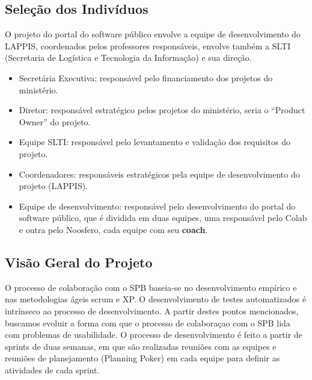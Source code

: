 
\subsection{Seleção dos Indivíduos}

O projeto do portal do software público envolve a equipe de desenvolvimento do LAPPIS, coordenados pelos professores responsáveis, envolve também a SLTI (Secretaria de Logística e Tecnologia da Informação) e sua direção.

\begin{itemize}

\item Secretária Executiva: responsável pelo financiamento dos projetos do ministério.

\item Diretor: responsável estratégico pelos projetos do ministério, seria o ``Product Owner'' do projeto.

\item Equipe SLTI: responsável pelo levantamento e validação dos requisitos do projeto.

\item Coordenadores: responsáveis estratégicos pela equipe de desenvolvimento do projeto (LAPPIS).

\item Equipe de desenvolvimento: responsável pelo desenvolvimento do portal do software público, que é dividida em duas equipes, uma responsável pelo Colab e outra pelo Noosfero, cada equipe com seu \textbf{coach}.

\end{itemize}

\subsection{Visão Geral do Projeto}

O processo de colaboração com o SPB baseia-se no desenvolvimento empírico e nas metodologias ágeis scrum e XP. O desenvolvimento de testes automatizados é intrínseco ao processo de desenvolvimento. A partir destes pontos mencionados, buscamos evoluir a forma com que o processo de colaboraçao com o SPB lida com problemas de usabilidade.
O processo de desenvolvimento é feito a partir de sprints de duas semanas, em que são realizadas reuniões com as equipes e reuniões de planejamento (Planning Poker) em cada equipe para definir as atividades de cada sprint.


